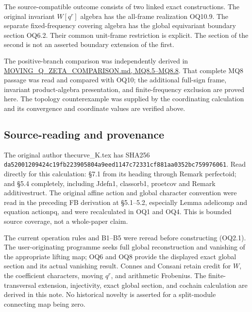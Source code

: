 The source-compatible outcome consists of two linked exact
constructions. The original invariant \(W[q^r]\) algebra has the
all-frame realization OQ10.9. The separate fixed-frequency covering
algebra has the global equivariant boundary section OQ6.2. Their common
unit-frame restriction is explicit. The section of the second is not an
asserted boundary extension of the first.

The positive-branch comparison was independently derived in
\href{https://github.com/KokunoYumeto/zeta-function-research-reader/blob/main/workbenches/splitzero-tandem/continuations/20260924-cohomology-weight-and-character-lifts/original-character-lifting/tau_lifting_weights_20260924/MOVING_Q_ZETA_COMPARISON.md}{MOVING\_Q\_ZETA\_COMPARISON.md,
MQ8.5--MQ8.8}. That complete MQ8 passage was read and compared with
OQ10; the additional full-sign frame, invariant product-algebra
presentation, and finite-frequency exclusion are proved here. The
topology counterexample was supplied by the coordinating calculation and
its convergence and coordinate values are verified above.

\subsection{Source-reading and
provenance}\label{source-reading-and-provenance}

The original author thecurve\_K.tex has SHA256
\nolinkurl{da52001209424c19fb223905804a9eed1147c72331cf881aa0352bc759976061}. Read
directly for this calculation: §7.1 from its heading through Remark
perfectoid; and §5.4 completely, including Jdefn1, classorb1, proetcov
and Remark additivestruct. The original affine action and global
character convention were read in the preceding FB derivation at
§5.1--5.2, especially Lemma adelicomp and equation actionpq, and were
recalculated in OQ1 and OQ4. This is bounded source coverage, not a
whole-paper claim.

The current operation rules and B1--B5 were reread before constructing
(OQ2.1). The user-originating programme seeks full global reconstruction
and vanishing of the appropriate lifting map; OQ6 and OQ8 provide the
displayed exact global section and its actual vanishing result. Connes
and Consani retain credit for \(W\), the coefficient characters, moving
\(q^r\), and arithmetic Frobenius. The finite-transversal extension,
injectivity, exact global section, and cochain calculation are derived
in this note. No historical novelty is asserted for a split-module
connecting map being zero.
